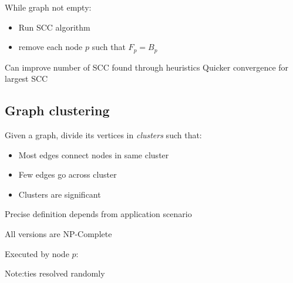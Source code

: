 {

	{
		While graph not empty:
		\begin{itemize}
			\item Run SCC algorithm
			\item remove each node $p$ such that $F_p = B_p$
		\end{itemize}
	}
	\vfill
	Can improve number of SCC found through heuristics
	\vfill
	Quicker convergence for largest SCC
}



\subsection{Graph clustering}

{
	{
		Given a graph, divide its vertices in \emph{clusters} such that:
		
		\begin{itemize}
			\item Most edges connect nodes in same cluster
			\item Few edges go across cluster
			\item Clusters are significant
		\end{itemize}
		Precise definition depends from application scenario
		
		All versions are NP-Complete
	}{
	}
}

{
            \begin{Procedure}
            \caption{Executed by node $p$:}
            \end{Procedure}	
			Note:ties resolved randomly
}

